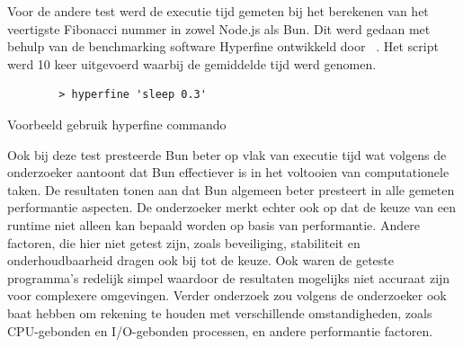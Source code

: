 Voor de andere test werd de executie tijd gemeten bij het berekenen van het veertigste Fibonacci nummer in zowel Node.js als Bun. 
Dit werd gedaan met behulp van de benchmarking software Hyperfine ontwikkeld door ~\textcite{Pompeii2024}. 
Het script werd 10 keer uitgevoerd waarbij de gemiddelde tijd werd genomen.
\begin{listing}[H]
    \centering
    \begin{verbatim}
        > hyperfine 'sleep 0.3'
        \end{verbatim}
        \caption{Voorbeeld gebruik hyperfine commando \autocite{Pompeii2024}}
\end{listing}
Ook bij deze test presteerde Bun beter op vlak van executie tijd wat volgens de onderzoeker aantoont dat Bun effectiever is in het voltooien van computationele taken.
De resultaten tonen aan dat 
Bun algemeen beter presteert in alle gemeten performantie aspecten.
De onderzoeker merkt echter ook op dat de keuze van een runtime niet alleen kan bepaald worden op basis van 
performantie. Andere factoren, die hier niet getest zijn, zoals beveiliging, stabiliteit en onderhoudbaarheid dragen ook bij tot de keuze. 
Ook waren de geteste programma's redelijk simpel waardoor de resultaten mogelijks niet accuraat zijn voor complexere omgevingen. 
Verder onderzoek zou volgens de onderzoeker ook baat hebben om rekening te houden met verschillende omstandigheden, zoals CPU-gebonden
en I/O-gebonden processen, en andere performantie factoren.